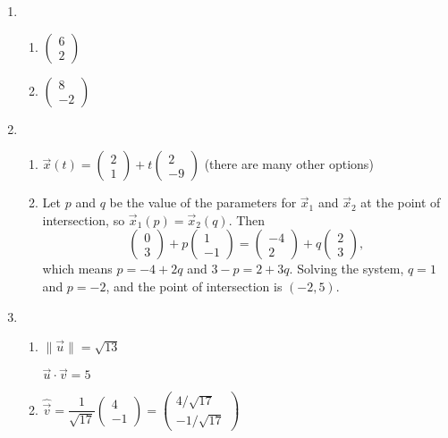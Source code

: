 \begin{enumerate}
\item \begin{enumerate}
\item $\begin{pmatrix} 6 \\ 2 \end{pmatrix}$
\item $\begin{pmatrix} 8 \\ -2 \end{pmatrix}$
\end{enumerate}
\item \begin{enumerate}
\item $\vec{x}(t) = \begin{pmatrix} 2 \\ 1 \end{pmatrix} + t\begin{pmatrix} 2 \\ -9 \end{pmatrix}$ (there are many other options)
\item Let $p$ and $q$ be the value of the parameters for $\vec{x}_1$ and $\vec{x}_2$ at the point of intersection, so $\vec{x}_1(p) = \vec{x}_2(q)$. Then
\begin{equation*}
\begin{pmatrix} 0 \\ 3 \end{pmatrix} + p\begin{pmatrix} 1 \\ -1 \end{pmatrix} = \begin{pmatrix} -4 \\ 2 \end{pmatrix} + q\begin{pmatrix} 2 \\ 3 \end{pmatrix},
\end{equation*}
which means $p = -4 + 2q$ and $3 - p = 2 + 3q$. Solving the system, $q = 1$ and $p = -2$, and the point of intersection is $(-2,5)$.
\end{enumerate}
\item \begin{enumerate}
\item $\|\vec{u}\| = \sqrt{13}$\par
$\vec{u}\cdot\vec{v} = 5$
\item $\hat{\vec{v}} = \dfrac{1}{\sqrt{17}}\begin{pmatrix} 4 \\ -1 \end{pmatrix} = \begin{pmatrix} 4/\sqrt{17} \\ -1/\sqrt{17} \end{pmatrix}$

\end{enumerate}
\end{enumerate}
